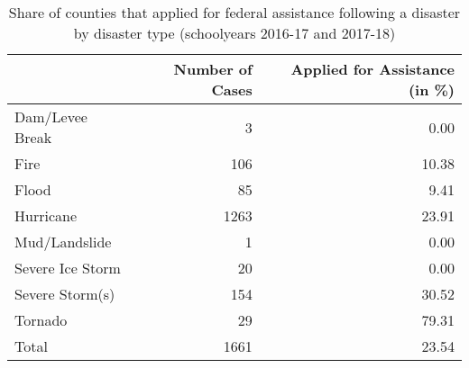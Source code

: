 \begin{table}

\caption{\label{tab:AppsByType}Share of counties that applied for federal assistance following a disaster by disaster type (schoolyears 2016-17 and 2017-18)}
\centering
\begin{tabular}[t]{lrr}
\toprule
  & Number of Cases & Applied for Assistance (in \%)\\
\midrule
Dam/Levee Break & 3 & 0.00\\
Fire & 106 & 10.38\\
Flood & 85 & 9.41\\
Hurricane & 1263 & 23.91\\
Mud/Landslide & 1 & 0.00\\
Severe Ice Storm & 20 & 0.00\\
Severe Storm(s) & 154 & 30.52\\
Tornado & 29 & 79.31\\
\addlinespace
Total & 1661 & 23.54\\
\bottomrule
\end{tabular}
\end{table}
